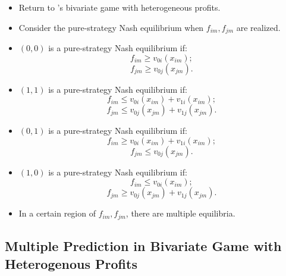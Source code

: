 \documentclass[
]{book}
\providecommand{\tightlist}{%
  \setlength{\itemsep}{0pt}\setlength{\parskip}{0pt}}
\begin{document}
\begin{itemize}
\tightlist
\item
  Return to \citet{tamerIncompleteSimultaneousDiscrete2003}'s bivariate game with heterogeneous profits.
\item
  Consider the pure-strategy Nash equilibrium when \(f_{im}, f_{jm}\) are realized.
\item
  \((0, 0)\) is a pure-strategy Nash equilibrium if:
  \[
  f_{im} \ge v_{0i}(x_{im});
  \]
  \[
  f_{jm} \ge v_{0j}(x_{jm}).
  \]
\item
  \((1, 1)\) is a pure-strategy Nash equilibrium if:
  \[
  f_{im} \le v_{0i}(x_{im}) + v_{1i}(x_{im});
  \]
  \[
  f_{jm} \le v_{0j}(x_{jm}) + v_{1j}(x_{jm}).
  \]
\item
  \((0, 1)\) is a pure-strategy Nash equilibrium if:
  \[
  f_{im} \ge v_{0i}(x_{im}) + v_{1i}(x_{im});
  \]
  \[
  f_{jm} \le v_{0j}(x_{jm}).
  \]
\item
  \((1, 0)\) is a pure-strategy Nash equilibrium if:
  \[
  f_{im} \le v_{0i}(x_{im});
  \]
  \[
  f_{jm} \ge v_{0j}(x_{jm}) + v_{1j}(x_{jm}).
  \]
\item
  In a certain region of \(f_{im}, f_{jm}\), there are multiple equilibria.
\end{itemize}

\hypertarget{multiple-prediction-in-bivariate-game-with-heterogenous-profits}{%
\subsection{Multiple Prediction in Bivariate Game with Heterogenous Profits}\label{multiple-prediction-in-bivariate-game-with-heterogenous-profits}}
\end{document}
